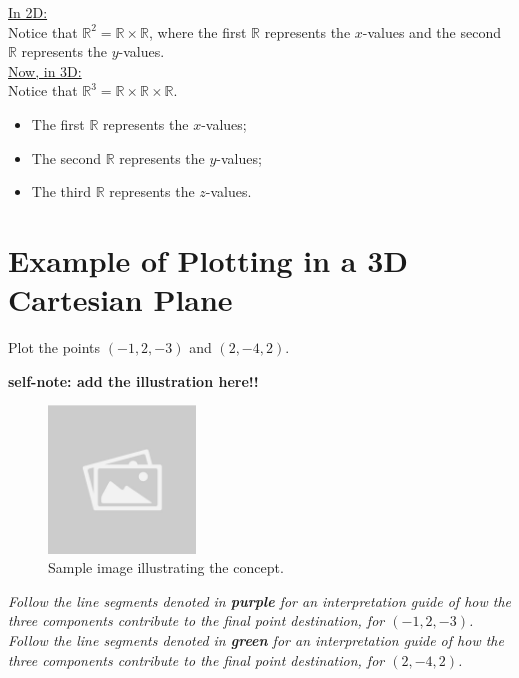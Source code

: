 \documentclass{article}
\begin{document}
\begin{notebox}
\underline{In 2D:} \\
Notice that \( \mathbb{R}^2 = \mathbb{R} \times \mathbb{R} \), where the first \( \mathbb{R} \) represents the \( x \)-values and the second \( \mathbb{R} \) represents the \( y \)-values.
\\
\underline{Now, in 3D:} \\
Notice that \( \mathbb{R}^3 = \mathbb{R} \times \mathbb{R} \times \mathbb{R} \).
\begin{itemize}
    \item The first \( \mathbb{R} \) represents the \( x \)-values;
    \item The second \( \mathbb{R} \) represents the \( y \)-values;
    \item The third \( \mathbb{R} \) represents the \( z \)-values.
\end{itemize}
\end{notebox}

\section*{Example of Plotting in a 3D Cartesian Plane}
\begin{examplebox}
Plot the points \( (-1, 2, -3) \) and \( (2, -4, 2) \).
\begin{illustrationbox}
    \textbf{self-note: add the illustration here!!}
    \begin{figure}[H]
        \centering
        \includegraphics[width=0.35\textwidth]{sample_image.jpg}
        \caption{Sample image illustrating the concept.}
        \label{fig:sample_image}
    \end{figure}
\end{illustrationbox}
\textit{Follow the line segments denoted in \textbf{purple} for an interpretation guide of how the three components contribute to the final point destination, for \( (-1, 2, -3) \).} \\
\textit{Follow the line segments denoted in \textbf{green} for an interpretation guide of how the three components contribute to the final point destination, for \( (2, -4, 2) \).} \\
\end{examplebox}
\end{document}
